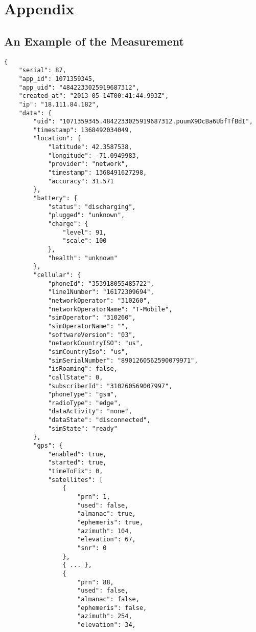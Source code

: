 \section{Appendix}
\label{s:appendix}

\subsection{An Example of the Measurement}
\scriptsize
\begin{verbatim}
{
    "serial": 87,
    "app_id": 1071359345,
    "app_uid": "4842233025919687312",
    "created_at": "2013-05-14T00:41:44.993Z",
    "ip": "18.111.84.182",
    "data": {
        "uid": "1071359345.4842233025919687312.puumX9DcBa6UbfTfBdI",
        "timestamp": 1368492034049,
        "location": {
            "latitude": 42.3587538,
            "longitude": -71.0949983,
            "provider": "network",
            "timestamp": 1368491627298,
            "accuracy": 31.571
        },
        "battery": {
            "status": "discharging",
            "plugged": "unknown",
            "charge": {
                "level": 91,
                "scale": 100
            },
            "health": "unknown"
        },
        "cellular": {
            "phoneId": "353918055485722",
            "line1Number": "16172309694",
            "networkOperator": "310260",
            "networkOperatorName": "T-Mobile",
            "simOperator": "310260",
            "simOperatorName": "",
            "softwareVersion": "03",
            "networkCountryISO": "us",
            "simCountryIso": "us",
            "simSerialNumber": "8901260562590079971",
            "isRoaming": false,
            "callState": 0,
            "subscriberId": "310260569007997",
            "phoneType": "gsm",
            "radioType": "edge",
            "dataActivity": "none",
            "dataState": "disconnected",
            "simState": "ready"
        },
        "gps": {
            "enabled": true,
            "started": true,
            "timeToFix": 0,
            "satellites": [
                {
                    "prn": 1,
                    "used": false,
                    "almanac": true,
                    "ephemeris": true,
                    "azimuth": 104,
                    "elevation": 67,
                    "snr": 0
                },
                { ... },
                {
                    "prn": 88,
                    "used": false,
                    "almanac": false,
                    "ephemeris": false,
                    "azimuth": 254,
                    "elevation": 34,

\end{verbatim}

